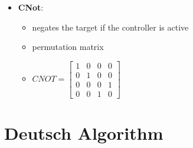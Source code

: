 \documentclass[12pt,a4paper]{article}
\begin{document}
\begin{itemize}
\item \textbf{CNot}:
\begin{itemize}
\item negates the target if the controller is active
\item permutation matrix
\item $CNOT = \begin{bmatrix}1 & 0 & 0 & 0\\0 & 1 & 0 & 0\\0 & 0 & 0 & 1\\0 & 0 & 1 & 0 \end{bmatrix}$
\end{itemize} 
\end{itemize}

\section{Deutsch Algorithm}
\end{document}
